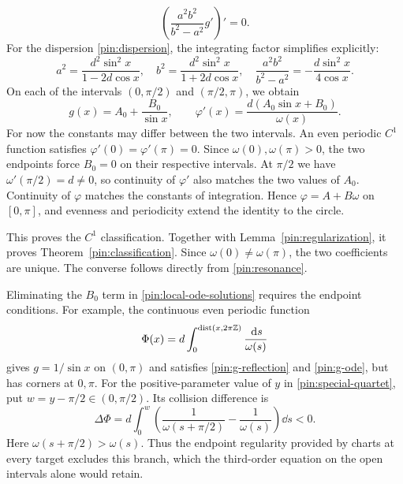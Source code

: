 \begin{equation}
                 \left(\frac{a^2b^2}{b^2-a^2}g'\right)'=0.
 \label{pin:conservative-ode}
\end{equation}
For the dispersion \eqref{pin:dispersion}, the integrating factor
simplifies explicitly:
\begin{equation}
 a^2=\frac{d^2\sin^2x}{1-2d\cos x},\quad
 b^2=\frac{d^2\sin^2x}{1+2d\cos x},\quad
 \frac{a^2b^2}{b^2-a^2}=-\frac{d\sin^2x}{4\cos x}.
 \label{pin:explicit-factor}
\end{equation}
On each of the intervals $(0,\pi/2)$ and $(\pi/2,\pi)$, we obtain
\begin{equation}
                   g(x)=A_0+\frac{B_0}{\sin x},\qquad
                   \varphi'(x)=\frac{d(A_0\sin x+B_0)}{\omega(x)}.
 \label{pin:local-ode-solutions}
\end{equation}
For now the constants may differ between the two intervals. An even
periodic $C^1$ function satisfies $\varphi'(0)=\varphi'(\pi)=0$.
Since $\omega(0),\omega(\pi)>0$, the two endpoints force
$B_0=0$ on their respective intervals. At $\pi/2$ we have
$\omega'(\pi/2)=d\ne0$, so continuity of $\varphi'$ also matches
the two values of $A_0$. Continuity of $\varphi$ matches the constants
of integration. Hence $\varphi=A+B\omega$ on $[0,\pi]$, and evenness
and periodicity extend the identity to the circle.

This proves the $C^1$ classification. Together with
Lemma~\ref{pin:regularization}, it proves
Theorem~\ref{pin:classification}. Since $\omega(0)\ne\omega(\pi)$,
the two coefficients are unique. The converse follows directly from
\eqref{pin:resonance}.

\begin{remark}
\label{pin:endpoint-test}
Eliminating the $B_0$ term in \eqref{pin:local-ode-solutions} requires
the endpoint conditions. For example, the continuous even periodic
function
\[
 \Phi(x)=d\int_0^{\operatorname{dist}(x,2\pi\mathbb Z)}\frac{\,\mathrm d s}{\omega(s)}
\]
gives $g=1/\sin x$ on $(0,\pi)$ and satisfies
\eqref{pin:g-reflection} and \eqref{pin:g-ode}, but has corners at
$0,\pi$. For the positive-parameter value of $y$ in
\eqref{pin:special-quartet}, put $w=y-\pi/2\in(0,\pi/2)$.
Its collision difference is
\[
 \Delta\Phi
   =d\int_0^w\left(\frac1{\omega(s+\pi/2)}
                         -\frac1{\omega(s)}\right)\dd s<0.
\]
Here $\omega(s+\pi/2)>\omega(s)$. Thus the endpoint regularity
provided by charts at every target excludes this branch, which the
third-order equation on the open intervals alone would retain.
\end{remark}

